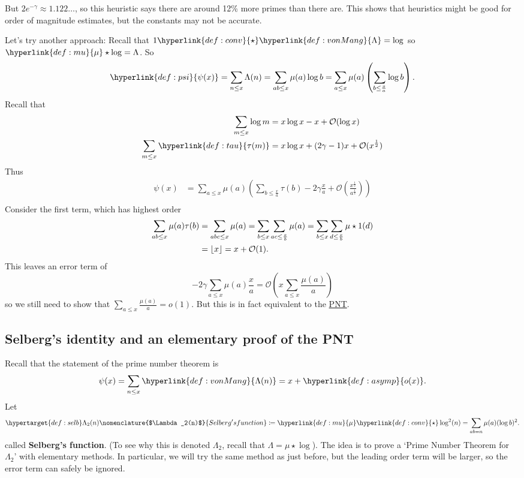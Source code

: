 \documentclass{article}
\newcommand{\named}[1]{\textbf{#1}\index{#1}}
\newcommand{\bigO}{\mathcal{O}}
\DeclarePairedDelimiter\floor{\lfloor}{\rfloor}
\begin{document}
But $2 e^{-\gamma} \approx 1.122\dots$, so this heuristic says there are around 12\% more primes than there are.
This shows that heuristics might be good for order of magnitude estimates, but the constants may not be accurate.

Let's try another approach:
Recall that $1 \hyperlink{def:conv}{\star} \hyperlink{def:vonMang}{\Lambda} = \log$ so $\hyperlink{def:mu}{\mu} \star \log = \Lambda$.
So
\begin{equation*}
  \hyperlink{def:psi}{\psi(x)} = \sum_{n \leq x} \Lambda(n) = \sum_{ab \leq x} \mu(a) \log b = \sum_{a \leq x} \mu(a) \left(\sum_{b \leq \frac{x}{a}} \log b\right).
\end{equation*}
Recall that
\begin{align*}
  \sum_{m \leq x} \log m &= x \log x - x + \bigO(\log x) \\
  \sum_{m \leq x} \hyperlink{def:tau}{\tau(m)} &= x \log x + (2 \gamma - 1) x + \bigO(x^{\frac{1}{2}})
\end{align*}
Thus
\begin{align*}
  \psi(x) &= \sum_{a \leq x} \mu(a) \left(\sum_{b \leq \frac{x}{a}} \tau(b) - 2 \gamma \frac{x}{a} + \bigO\left(\frac{x^{\frac{1}{2}}}{a^{\frac{1}{2}}}\right)\right) \\
\end{align*}
Consider the first term, which has highest order
\begin{align*}
 \sum_{ab \leq x} \mu(a) \tau(b) &= \sum_{abc \leq x} \mu(a) = \sum_{b \leq x} \sum_{ac \leq \frac{x}{b}} \mu(a) = \sum_{b \leq x} \sum_{d \leq \frac{x}{b}} \mu \star 1(d) \\
          &= \floor{x} = x + \bigO(1).
\end{align*}
This leaves an error term of
\begin{equation*}
  -2 \gamma \sum_{a \leq x} \mu(a) \frac{x}{a} = \bigO\left(x \sum_{a \leq x} \frac{\mu(a)}{a}\right)
\end{equation*}
so we still need to show that $\sum_{a \leq x} \frac{\mu(a)}{a} = o(1)$. But this is in fact equivalent to the \hyperlink{def:pnt}{PNT}.

\subsection{Selberg's identity and an elementary proof of the PNT}
\newlec
Recall that the statement of the prime number theorem is
\begin{equation*}
  \psi(x) = \sum_{n \leq x} \hyperlink{def:vonMang}{\Lambda(n)} = x + \hyperlink{def:asymp}{o(x)}.
\end{equation*}
Let
\begin{equation*}
  \hypertarget{def:selb}\Lambda_2(n)\nomenclature{$\Lambda_2(n)$}{Selberg's function} \coloneqq \hyperlink{def:mu}{\mu} \hyperlink{def:conv}{\star} \log^2 (n) = \sum_{ab=n} \mu(a) (\log b)^2.
\end{equation*}
called \named{Selberg's function}. (To see why this is denoted $\Lambda_2$, recall that $\Lambda = \mu \star \log$).
The idea is to prove a `Prime Number Theorem for $\Lambda_2$' with elementary methods.
In particular, we will try the same method as just before, but the leading order term will be larger, so the error term can safely be ignored.
\end{document}
